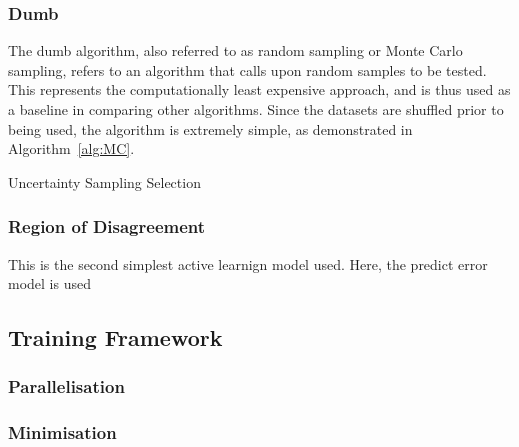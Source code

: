 \subsubsection{Dumb}
The dumb algorithm, also referred to as random sampling or Monte Carlo sampling, refers to an algorithm that calls upon random samples to be tested. This represents the computationally least expensive approach, and is thus used as a baseline in comparing other algorithms. Since the datasets are shuffled prior to being used, the algorithm is extremely simple, as demonstrated in Algorithm~\ref{alg:MC}.

\begin{algorithm}[h]
    \caption{Uncertainty Sampling Selection}
    \label{alg:MC}\SetAlgoLined
\end{algorithm}

\subsubsection{Region of Disagreement}
This is the second simplest active learnign model used. Here, the predict error model is used
\subsection{Training Framework}
\blindtext[1]
\subsubsection{Parallelisation}
\blindtext[1]
\subsubsection{Minimisation}
\blindtext[1]
